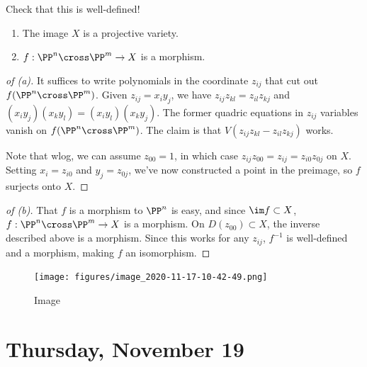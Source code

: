 Check that this is well-defined!

\begin{proposition}

\envlist

\begin{enumerate}
\def\labelenumi{\alph{enumi}.}
\item
  The image \(X\) is a projective variety.
\item
  \(f: \PP^n \cross \PP^m \to X\) is a morphism.
\end{enumerate}

\end{proposition}

\begin{proof}[of (a)]

It suffices to write polynomials in the coordinate \(z_{ij}\) that cut
out \(f(\PP^n \cross \PP^m)\). Given \(z_{ij} = x_i y_j\), we have
\(z_{ij} z_{kl} = z_{il} z_{kj}\) and
\((x_i y_j)(x_k y_l) = (x_i y_l)(x_k y_j)\). The former quadric
equations in \(z_{ij}\) variables vanish on \(f(\PP^n \cross \PP^m)\).
The claim is that \(V(z_{ij} z_{kl} - z_{il} z_{kj})\) works.

Note that wlog, we can assume \(z_{00} = 1\), in which case
\(z_{ij} z_{00} = z_{ij} = z_{i0} z_{0j}\) on \(X\). Setting
\(x_i = z_{i0}\) and \(y_j = z_{0j}\), we've now constructed a point in
the preimage, so \(f\) surjects onto \(X\).

\end{proof}

\begin{proof}[of (b)]

That \(f\) is a morphism to \(\PP^n\) is easy, and since
\(\im f \subset X\), \(f: \PP^n \cross \PP^m \to X\) is a morphism. On
\(D(z_{00}) \subset X\), the inverse described above is a morphism.
Since this works for any \(z_{ij}\), \(f^{-1}\) is well-defined and a
morphism, making \(f\) an isomorphism.

\end{proof}

\begin{example}[?]

\begin{figure}
\centering
\texttt{[image: figures/image\_2020-11-17-10-42-49.png]}
\caption{Image}
\end{figure}

\end{example}

\hypertarget{thursday-november-19}{%
\section{Thursday, November 19}\label{thursday-november-19}}

